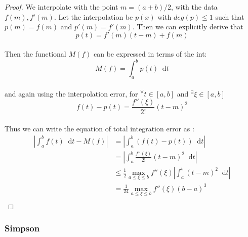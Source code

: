 \documentclass[paper=a4, fontsize=11pt]{scrartcl}
\newcommand*\dif{\mathop{}\!\mathrm{d}}
\begin{document}
\begin{proof}
	We interpolate with the point $m=(a+b)/2$, with the data $f(m),f'(m)$. Let the interpolation be $p(x)$ with $deg(p)\leq 1$ such that $p(m)=f(m)$ and $p'(m)=f'(m)$. Then we can explicitly derive that \\
	
	\begin{equation}\nonumber
		p(t)= f'(m)(t-m) + f(m)
	\end{equation}\\
	
	Then the functional $M(f)$ can be expressed in terms of the int: \\
	
	\begin{equation}\nonumber
		M(f) = \int_{a}^{b} p(t) \dif t
	\end{equation}\\
	
	and again using the interpolation error, for $^\forall t \in [a,b]$ and $^\exists \xi \in [a,b]$ \\
	
	\begin{equation}\nonumber
		f(t)-p(t) =  \frac{f''(\xi)}{2!}(t-m)^2
	\end{equation}\\
	
	Thus we can write the equation of total integration error as :\\
	
	\begin{equation}\nonumber
		\begin{split}
		\left| \int_{a}^{b} f(t) \dif t - M(f) \right| &= \left| \int_{a}^{b} (f(t) - p(t))  \dif t \right| \\[2.5ex]
		&= \left| \int_{a}^{b} \frac{f''(\xi)}{2!}(t-m)^2 \dif t \right| \\[2.5ex]
		&\leq \frac{1}{2} \max_{a\leq\xi\leq b}f''(\xi) \left| \int_{a}^{b} (t-m)^2 \dif t \right| \\[2.5ex]
		&= \frac{1}{24} \max_{a\leq\xi\leq b}f''(\xi) (b-a)^3 \\
		\end{split}
	\end{equation}
	
\end{proof}

\subsubsection{Simpson}
\end{document}
